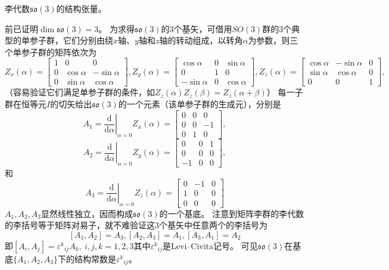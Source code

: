 \begin{example}
    李代数$\mathfrak{so}(3)$的结构张量。

    前已证明$\dim \mathfrak{so}(3) = 3$。
    为求得$\mathfrak{so}(3)$的$3$个基矢，可借用$SO(3)$群的$3$个典型的单参子群，它们分别由绕$x$轴、$y$轴和$z$轴的转动组成，以转角$\alpha$为参数，则三个单参子群的矩阵依次为
    $$Z_x(\alpha) = \begin{bmatrix}
        1 & 0 & 0 \\
        0 & \cos\alpha & -\sin\alpha \\
        0 & \sin\alpha & \cos\alpha
    \end{bmatrix}, Z_y(\alpha) = \begin{bmatrix}
        \cos\alpha & 0 & \sin\alpha \\
        0 & 1 & 0 \\
        -\sin\alpha & 0 & \cos\alpha
    \end{bmatrix}, Z_z(\alpha) = \begin{bmatrix}
        \cos\alpha & -\sin\alpha & 0 \\
        \sin\alpha & \cos\alpha & 0 \\
        0 & 0 & 1
    \end{bmatrix},$$（容易验证它们满足单参子群的条件，如$Z_z(\alpha)Z_z(\beta) = Z_z(\alpha + \beta)$）
    每一子群在恒等元$I$的切矢给出$\mathfrak{so}(3)$的一个元素（该单参子群的生成元），分别是
    $$A_1 = \left.\frac{\mathrm{d}}{\mathrm{d}\alpha}\right|_{\alpha = 0}Z_x(\alpha) = \begin{bmatrix}
        0 & 0 & 0 \\
        0 & 0 & -1 \\
        0 & 1 & 0
    \end{bmatrix},$$
    $$A_2 = \left.\frac{\mathrm{d}}{\mathrm{d}\alpha}\right|_{\alpha = 0}Z_y(\alpha) = \begin{bmatrix}
        0 & 0 & 1 \\
        0 & 0 & 0 \\
        -1 & 0 & 0
    \end{bmatrix}, $$
    和
    $$A_3 = \left.\frac{\mathrm{d}}{\mathrm{d}\alpha}\right|_{\alpha = 0}Z_z(\alpha) = \begin{bmatrix}
        0 & -1 & 0 \\
        1 & 0 & 0 \\
        0 & 0 & 0
    \end{bmatrix}$$
    $A_1, A_2, A_3$显然线性独立，因而构成$\mathfrak{so}(3)$的一个基底。
    注意到矩阵李群的李代数的李括号等于矩阵对易子，就不难验证这$3$个基矢中任意两个的李括号为
    $$[A_1, A_2] = A_3, [A_2, A_3] = A_1, [A_3, A_1] = A_2$$
    即$[A_i, A_j] = \varepsilon^k{}_{ij}A_k, ~ i, j, k = 1, 2, 3$其中$\varepsilon^k{}_{ij}$是Levi--Civita记号。
    可见$\mathfrak{so}(3)$在基底$\{A_1, A_2, A_3\}$下的结构常数是$\varepsilon^k{}_{ij}$。
\end{example}


